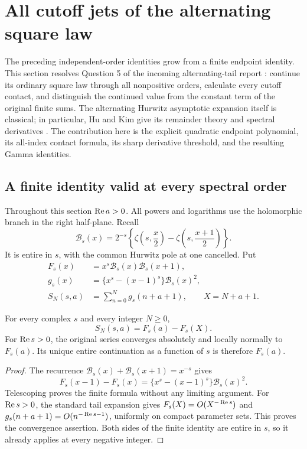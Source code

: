 \section{All cutoff jets of the alternating square law}
\label{cut:sec}

The preceding independent-order identities grow from a finite endpoint
identity. This section resolves Question 5 of the incoming alternating-tail
report \cite{AlternatingIncoming}: continue its ordinary square law through
all nonpositive orders, calculate every cutoff contact, and distinguish the
continued value from the constant term of the original finite sums. The
alternating Hurwitz asymptotic expansion itself is classical; in particular,
Hu and Kim give its remainder theory and spectral derivatives
\cite{HuKimAsymptotic}. The contribution here is the explicit quadratic
endpoint polynomial, its all-index contact formula, its sharp derivative
threshold, and the resulting Gamma identities.

\subsection{A finite identity valid at every spectral order}

Throughout this section $\operatorname{Re} a>0$. All powers and logarithms use the
holomorphic branch in the right half-plane. Recall
\begin{equation}\label{cut:B}
 \mathcal B_s(x)=2^{-s}\left\{\zeta\left(s,\frac{x}{2}\right)
                    -\zeta\left(s,\frac{x+1}{2}\right)\right\}.
\end{equation}
It is entire in $s$, with the common Hurwitz pole at one cancelled.
Put
\begin{align}
 F_s(x)&=x^s\mathcal B_s(x)\mathcal B_s(x+1),\label{cut:F}\\
 g_s(x)&=\{x^s-(x-1)^s\}\mathcal B_s(x)^2,\label{cut:g}\\
 S_N(s,a)&=\sum_{n=0}^{N}g_s(n+a+1),\qquad X=N+a+1.
 \label{cut:SN}
\end{align}

\begin{lemma}\label{cut:finite}
For every complex $s$ and every integer $N\ge0$,
\begin{equation}\label{cut:finiteeq}
 S_N(s,a)=F_s(a)-F_s(X).
\end{equation}
For $\operatorname{Re} s>0$, the original series converges absolutely and locally
normally to $F_s(a)$. Its unique entire continuation as a function of $s$
is therefore $F_s(a)$.
\end{lemma}
\begin{proof}
The recurrence
$\mathcal B_s(x)+\mathcal B_s(x+1)=x^{-s}$ gives
\[
 F_s(x-1)-F_s(x)
 =\{x^s-(x-1)^s\}\mathcal B_s(x)^2.
\]
Telescoping proves the finite formula without any limiting argument.
For $\operatorname{Re} s>0$, the standard tail expansion gives
$F_s(X)=O(X^{-\operatorname{Re} s})$ and
$g_s(n+a+1)=O(n^{-\operatorname{Re} s-1})$, uniformly on compact parameter sets.
This proves the convergence assertion. Both sides of the finite identity
are entire in $s$, so it already applies at every negative integer.
\end{proof}

